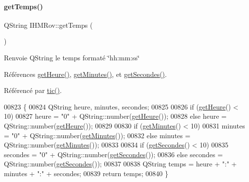 \paragraph{\texorpdfstring{get\+Temps()}{getTemps()}}
{\footnotesize\ttfamily Q\+String I\+H\+M\+Rov\+::get\+Temps (\begin{DoxyParamCaption}{ }\end{DoxyParamCaption})\hspace{0.3cm}{\ttfamily [private]}}

\begin{DoxyReturn}{Renvoie}
Q\+String le temps formaté \char`\"{}hh\+:mm\+:ss\char`\"{} 
\end{DoxyReturn}


Références \hyperlink{class_i_h_m_rov_a149d6d6325acf3f00bf025cb2fbac05f}{get\+Heure()}, \hyperlink{class_i_h_m_rov_ad6d275fe98c3dd1e40b2ef0defff3be9}{get\+Minutes()}, et \hyperlink{class_i_h_m_rov_ad28dd7ea40587335f6554de60c828524}{get\+Secondes()}.



Référencé par \hyperlink{class_i_h_m_rov_a4a0d3a0741d0669ede732b630eae54c6}{tic()}.


\begin{DoxyCode}
00823 \{
00824     QString heure, minutes, secondes;
00825 
00826    \textcolor{keywordflow}{if} (\hyperlink{class_i_h_m_rov_a149d6d6325acf3f00bf025cb2fbac05f}{getHeure}() < 10)
00827       heure = \textcolor{stringliteral}{"0"} + QString::number(\hyperlink{class_i_h_m_rov_a149d6d6325acf3f00bf025cb2fbac05f}{getHeure}());
00828    \textcolor{keywordflow}{else} heure = QString::number(\hyperlink{class_i_h_m_rov_a149d6d6325acf3f00bf025cb2fbac05f}{getHeure}());
00829 
00830    \textcolor{keywordflow}{if} (\hyperlink{class_i_h_m_rov_ad6d275fe98c3dd1e40b2ef0defff3be9}{getMinutes}() < 10)
00831       minutes = \textcolor{stringliteral}{"0"} + QString::number(\hyperlink{class_i_h_m_rov_ad6d275fe98c3dd1e40b2ef0defff3be9}{getMinutes}());
00832    \textcolor{keywordflow}{else} minutes = QString::number(\hyperlink{class_i_h_m_rov_ad6d275fe98c3dd1e40b2ef0defff3be9}{getMinutes}());
00833 
00834    \textcolor{keywordflow}{if} (\hyperlink{class_i_h_m_rov_ad28dd7ea40587335f6554de60c828524}{getSecondes}() < 10)
00835       secondes = \textcolor{stringliteral}{"0"} + QString::number(\hyperlink{class_i_h_m_rov_ad28dd7ea40587335f6554de60c828524}{getSecondes}());
00836    \textcolor{keywordflow}{else} secondes = QString::number(\hyperlink{class_i_h_m_rov_ad28dd7ea40587335f6554de60c828524}{getSecondes}());
00837 
00838    QString temps = heure + \textcolor{stringliteral}{":"} + minutes + \textcolor{stringliteral}{":"} + secondes;
00839    \textcolor{keywordflow}{return} temps;
00840 \}
\end{DoxyCode}
\mbox{\label{class_i_h_m_rov_a64002e867300c8aff2ebd4568acc107e}} 
